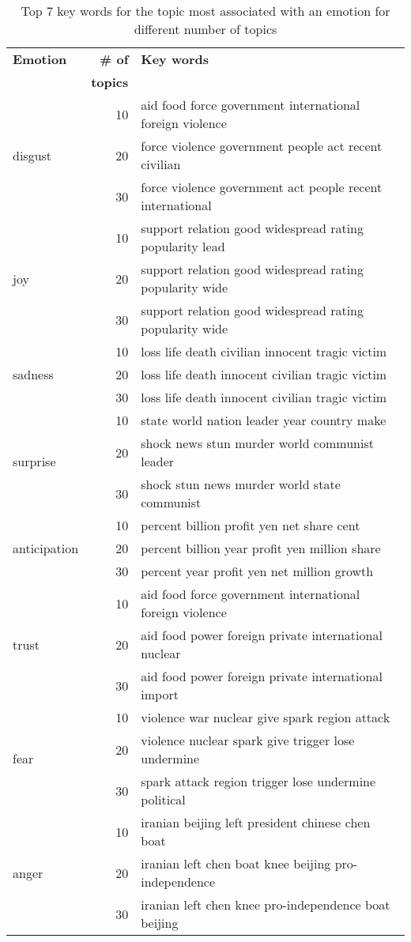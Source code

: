 \begin{table}[]
\centering
\begin{tabular}{l|r|l}
{\bf Emotion} & {\bf \# of} & {\bf Key words} \\
& {\bf topics} & \\\hline
\multirow{3}{*}{disgust} & 10 & aid food force government international foreign violence\\
 & 20 & force violence government people act recent civilian\\
 & 30 & force violence government act people recent international\\\hline
\multirow{3}{*}{joy} & 10 & support relation good widespread rating popularity lead\\
 & 20 & support relation good widespread rating popularity wide\\
 & 30 & support relation good widespread rating popularity wide\\\hline
\multirow{3}{*}{sadness} & 10 & loss life death civilian innocent tragic victim\\
 & 20 & loss life death innocent civilian tragic victim\\
 & 30 & loss life death innocent civilian tragic victim\\\hline
\multirow{3}{*}{surprise} & 10 & state world nation leader year country make\\
 & 20 & shock news stun murder world communist leader\\
 & 30 & shock stun news murder world state communist\\\hline
\multirow{3}{*}{anticipation} & 10 & percent billion profit yen net share cent\\
 & 20 & percent billion year profit yen million share\\
 & 30 & percent year profit yen net million growth\\\hline
\multirow{3}{*}{trust} & 10 & aid food force government international foreign violence\\
 & 20 & aid food power foreign private international nuclear\\
 & 30 & aid food power foreign private international import\\\hline
\multirow{3}{*}{fear} & 10 & violence war nuclear give spark region attack\\
 & 20 & violence nuclear spark give trigger lose undermine\\
 & 30 & spark attack region trigger lose undermine political\\\hline
\multirow{3}{*}{anger} & 10 & iranian beijing left president chinese chen boat\\
 & 20 & iranian left chen boat knee beijing pro-independence\\
 & 30 & iranian left chen knee pro-independence boat beijing
\end{tabular}
\caption{Top 7 key words for the topic most associated with an emotion for different number of topics}
\label{tab:topic-key-words}
\end{table}

